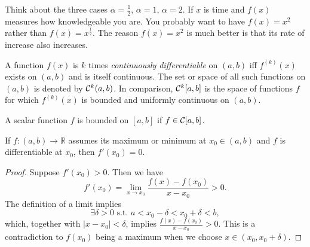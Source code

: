 \begin{rem}
  Think about the three cases $\alpha=\frac{1}{2}$,
  $\alpha=1$, $\alpha=2$.
  If $x$ is time and $f(x)$ measures how knowledgeable you are.
  You probably want to have $f(x)=x^2$ rather than
  $f(x)=x^{\frac{1}{2}}$.
  The reason $f(x)=x^2$ is much better is that
  its rate of increase also increases.
\end{rem}

\begin{defn}
  A function $f(x)$ is
   $k$ times \emph{continuously differentiable}
   on $(a,b)$
   iff $f^{(k)}(x)$ exists on $(a,b)$ and is itself continuous.
  The set or space of all such functions on $(a,b)$
   is denoted by ${\cal C}^k(a,b)$.
  In comparison,
   ${\cal C}^k[a,b]$ is the space of functions $f$
   for which $f^{(k)}(x)$ is bounded and uniformly continuous on $(a,b)$.
\end{defn}

\begin{thm}
  \label{thm:continuousImpliesBoundedness}
  A scalar function $f$ is bounded on $[a,b]$
   if $f\in {\cal C}[a,b]$.
\end{thm}

\begin{thm}
  \label{thm:Fermat}
  If $f:(a,b)\rightarrow\mathbb{R}$
   assumes its maximum or minimum at $x_0\in(a,b)$
   and $f$ is differentiable at $x_0$,
   then $f'(x_0)=0$.
\end{thm}
\begin{proof}
  Suppose $f'(x_0)>0$. Then we have
  \begin{displaymath}
    f'(x_0)=\lim_{x\rightarrow x_0} \frac{f(x)-f(x_0)}{x-x_0}>0.
  \end{displaymath}
  The definition of a limit implies
  \begin{displaymath}
   \exists \delta>0 \text{ s.t. } 
   a<x_0-\delta<x_0+\delta<b,
  \end{displaymath}
   which, together with $|x-x_0|<\delta$, 
   implies
   $\frac{f(x)-f(x_0)}{x-x_0}>0$.
  This is a contradiction to $f(x_0)$ being a maximum
  when we choose $x\in(x_0,x_0+\delta)$.
\end{proof}

